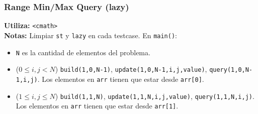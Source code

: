 \subsubsection{Range Min/Max Query (lazy)}
\begin{footnotesize}
	\textbf{Utiliza:} \texttt{<cmath>}\\
	\textbf{Notas:} Limpiar \texttt{st} y \texttt{lazy} en cada testcase. En \texttt{main()}: \\
	\begin{itemize}
		\item \texttt{N} es la cantidad de elementos del problema.
		\item ($ 0 \leq i,j < N $) \texttt{build(1,0,N-1)}, \texttt{update(1,0,N-1,i,j,value)}, \texttt{query(1,0,N-1,i,j)}. Los elementos en \texttt{arr} tienen que estar desde \texttt{arr[0]}.
		\item ($ 1 \leq i,j \leq N $) \texttt{build(1,1,N)}, \texttt{update(1,1,N,i,j,value)}, \texttt{query(1,1,N,i,j)}. Los elementos en \texttt{arr} tienen que estar desde \texttt{arr[1]}.
	\end{itemize}
\end{footnotesize}

